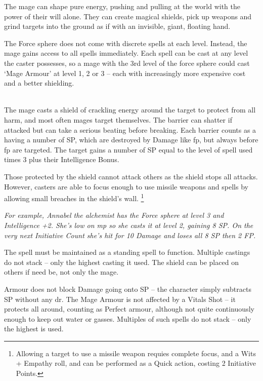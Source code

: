 
\begin{multicols}{2}

The mage can shape pure energy, pushing and pulling at the world with the power of their will alone. They can create magical shields, pick up weapons and grind targets into the ground as if with an invisible, giant, floating hand.

The Force sphere does not come with discrete spells at each level.
Instead, the mage gains access to all spells immediately.
Each spell can be cast at any level the caster possesses, so a mage with the 3rd level of the force sphere could cast `Mage Armour' at level 1, 2 or 3 -- each with increasingly more expensive cost and a better shielding.

\\
The mage casts a shield of crackling energy around the target to protect from all harm, and most often mages target themselves.  The barrier can shatter if attacked but can take a serious beating before breaking. Each barrier counts as a having a number of \gls{SP}, which are destroyed by Damage like \gls{fp}, but always before \gls{fp} are targeted.
The target gains a number of \gls{SP} equal to the level of spell used times 3 plus their Intelligence Bonus.

Those protected by the shield cannot attack others as the shield stops all attacks.
However, casters are able to focus enough to use missile weapons and spells by allowing small breaches in the shield's wall.
\footnote{Allowing a target to use a missile weapon requies complete focus, and a Wits + Empathy roll, and can be performed as a Quick action, costing 2 Initiative Points.}

\textit{For example, Annabel the alchemist has the Force sphere at level 3 and Intelligence +2.
She's low on \gls{mp} so she casts it at level 2, gaining 8 \gls{SP}.
On the very next Initiative Count she's hit for 10 Damage and loses all 8 \gls{SP} then 2 FP.}

The spell must be maintained as a standing spell to function. Multiple castings do not stack -- only the highest casting it used. The shield can be placed on others if need be, not only the mage.

Armour does not block Damage going onto \gls{SP} -- the character simply subtracts \gls{SP} without any \gls{dr}. The Mage Armour is not affected by a Vitals Shot -- it protects all around, counting as Perfect armour, although not quite continuously enough to keep out water or gasses. Multiples of such spells do not stack -- only the highest is used.


\end{multicols}
